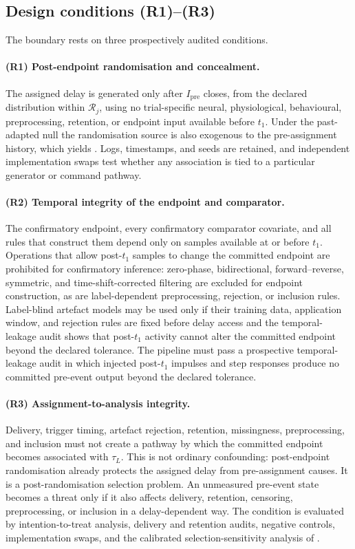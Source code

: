 \documentclass[11pt,a4paper]{article}
\theoremstyle{definition}
\newcommand{\tauL}{\tau_L}
\begin{document}
\subsection{Design conditions (R1)--(R3)}
\label{sec:conditions}

The boundary rests on three prospectively audited conditions.

\paragraph{(R1) Post-endpoint randomisation and concealment.}
The assigned delay is generated only after \(I_{\mathrm{pre}}\) closes, from the
declared distribution within \(\mathcal{R}_j\), using no trial-specific neural,
physiological, behavioural, preprocessing, retention, or endpoint input available
before \(t_1\). Under the past-adapted null the randomisation source is also
exogenous to the pre-assignment history, which yields
. Logs, timestamps, and seeds are retained,
and independent implementation swaps test whether any association is tied to a
particular generator or command pathway.

\paragraph{(R2) Temporal integrity of the endpoint and comparator.}
The confirmatory endpoint, every confirmatory comparator covariate, and all rules
that construct them depend only on samples available at or before \(t_1\).
Operations that allow post-\(t_1\) samples to change the committed endpoint are
prohibited for confirmatory inference: zero-phase, bidirectional,
forward--reverse, symmetric, and time-shift-corrected filtering are excluded for
endpoint construction, as are label-dependent preprocessing, rejection, or
inclusion rules. Label-blind artefact models may be used only if their training
data, application window, and rejection rules are fixed before delay access and
the temporal-leakage audit shows that post-\(t_1\) activity cannot alter the
committed endpoint beyond the declared tolerance. The pipeline must pass a
prospective temporal-leakage audit in which injected post-\(t_1\) impulses and
step responses produce no committed pre-event output beyond the declared
tolerance.

\paragraph{(R3) Assignment-to-analysis integrity.}
Delivery, trigger timing, artefact rejection, retention, missingness,
preprocessing, and inclusion must not create a pathway by which the committed
endpoint becomes associated with \(\tauL\). This is not ordinary confounding:
post-endpoint randomisation already protects the assigned delay from
pre-assignment causes. It is a post-randomisation selection problem. An unmeasured
pre-event state becomes a threat only if it also affects delivery, retention,
censoring, preprocessing, or inclusion in a delay-dependent way. The condition is
evaluated by intention-to-treat analysis, delivery and retention audits, negative
controls, implementation swaps, and the calibrated selection-sensitivity analysis
of .
\end{document}
